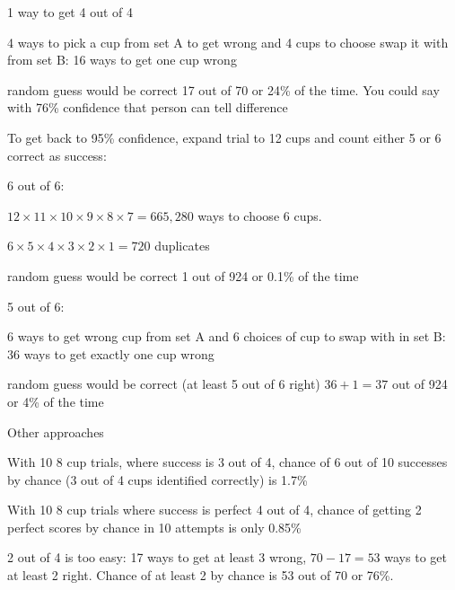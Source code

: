 \documentclass[landscape]{exam}
\begin{document}
  \begin{itemize*}
    \item 1 way to get 4 out of 4
    \item 4 ways to pick a cup from set A to get wrong and 4 cups to choose swap
      it with from set B: 16 ways to get one cup wrong
    \item random guess would be correct 17 out of 70 or 24\% of the time.  You
      could say with 76\% confidence that person can tell difference
  \end{itemize*}

  To get back to 95\% confidence, expand trial to 12 cups and count either 5 or
  6 correct as success:

  6 out of 6:
  \begin{itemize*}
    \item $12 \times 11 \times 10 \times 9 \times 8 \times 7 = 665,280$ ways to
      choose 6 cups.  
    \item $6 \times 5 \times 4 \times 3 \times 2 \times 1 = 720$ duplicates
    \item random guess would be correct 1 out of 924 or 0.1\% of the time
  \end{itemize*}

  5 out of 6:
  \begin{itemize*}
    \item 6 ways to get wrong cup from set A and 6 choices of cup to swap with
      in set B: 36 ways to get exactly one cup wrong
    \item random guess would be correct (at least 5 out of 6 right) $36 + 1 =
      37$ out of 924 or 4\% of the time
  \end{itemize*}

  Other approaches
  \begin{itemize*}
    \item With 10 8 cup trials, where success is 3 out of 4, chance of 6 out of
      10 successes by chance (3 out of 4 cups identified correctly) is 1.7\%
      
    \item With 10 8 cup trials where success is perfect 4 out of 4, chance of
      getting 2 perfect scores by chance in 10 attempts is only 0.85\%
  \end{itemize*}

  2 out of 4 is too easy: 17 ways to get at least 3 wrong, $70 - 17 = 53$ ways
  to get at least 2 right.  Chance of at least 2 by chance is 53 out of 70 or
  76\%.
\end{document}
